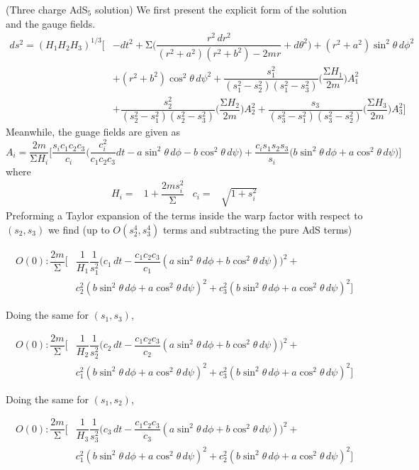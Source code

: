 \vspace{2ex}
\begin{ex}
(Three charge AdS$_5$ solution) We first present the explicit form of the solution and the gauge fields.
\[\begin{align*}
	ds^2=(H_1H_2H_3)^{1/3}\Big[&-dt^2+\mathrm{\Sigma} \Big(\dfrac{r^2\,dr^2}{(r^2+a^2)(r^2+b^2)-2mr}+d\theta ^2\Big)+(r^2+a^2)\sin ^2\theta \,d\phi ^2\\
	&+(r^2+b^2)\cos ^2\theta \,d\psi ^2+\dfrac{s_1^2}{(s_1^2-s_2^2)(s_1^2-s_3^2)}\Big(\dfrac{\mathrm{\Sigma} H_1}{2m}\Big)A_1^2\\
	&+\dfrac{s_2^2}{(s_2^2-s_1^2)(s_2^2-s_3^2)}\Big(\dfrac{\mathrm{\Sigma} H_2}{2m}\Big)A_2^2+\dfrac{s_3}{(s_3^2-s_1^2)(s_3^2-s_2^2)}\Big(\dfrac{\mathrm{\Sigma} H_3}{2m}\Big)A_3^2\Big]
\end{align*}\]
Meanwhile, the guage fields are given as 
\[A_{i}=\dfrac{2m}{\mathrm{\Sigma} H_{i}}\Big[\dfrac{s_{i}c_1c_2c_3}{c_{i}}\Big(\dfrac{c_{i}^2}{c_1c_2c_3}dt-a\sin ^2\theta \,d\phi -b\cos ^2\theta \,d\psi \Big)+\dfrac{c_{i}s_1s_2s_3}{s_{i}}\Big(b\sin ^2\theta \,d\phi +a\cos ^2\theta\, d\psi \Big)\Big]\]
where
\[\begin{align*}
	H_{i}=&1+\dfrac{2ms_{i}^2}{\mathrm{\Sigma} }&c_{i}=&\sqrt{1+s_{i}^2}
\end{align*}\]
Preforming a Taylor expansion of the terms inside the warp factor with respect to $(s_2,s_3)$ we find (up to $O(s_2^{4},s_3^{4})$ terms and subtracting the pure AdS terms)

\[\begin{align*}
	O(0):\dfrac{2m}{\mathrm{\Sigma} }\Big[&\dfrac{1}{H_1}\dfrac{1}{s_1^2}\Big(c_1\,dt-\dfrac{c_1c_2c_3}{c_1}(a\sin ^2\theta \,d\phi +b\cos ^2\theta \,d\psi )\Big)^2+\\ &c_2^2(b\sin ^2\theta \,d\phi +a\cos ^2\theta \,d\psi )^2+c_3^2(b\sin ^2\theta \,d\phi +a\cos ^2\theta \,d\psi )^2\Big]
\end{align*}\]

Doing the same for $(s_1,s_3)$,

\[\begin{align*}
O(0):\dfrac{2m}{\mathrm{\Sigma} }\Big[&\dfrac{1}{H_2}\dfrac{1}{s_2^2}\Big(c_2\,dt-\dfrac{c_1c_2c_3}{c_2}(a\sin ^2\theta \,d\phi +b\cos ^2\theta \,d\psi )\Big)^2+\\ &c_1^2(b\sin ^2\theta \,d\phi +a\cos ^2\theta \,d\psi )^2+c_3^2(b\sin ^2\theta \,d\phi +a\cos ^2\theta \,d\psi )^2\Big]
\end{align*}\]

Doing the same for $(s_1,s_2)$,

\[\begin{align*}
O(0):\dfrac{2m}{\mathrm{\Sigma} }\Big[&\dfrac{1}{H_3}\dfrac{1}{s_3^2}\Big(c_3\,dt-\dfrac{c_1c_2c_3}{c_3}(a\sin ^2\theta \,d\phi +b\cos ^2\theta \,d\psi )\Big)^2+\\ &c_1^2(b\sin ^2\theta \,d\phi +a\cos ^2\theta \,d\psi )^2+c_2^2(b\sin ^2\theta \,d\phi +a\cos ^2\theta \,d\psi )^2\Big]
\end{align*}\]

\end{ex}
